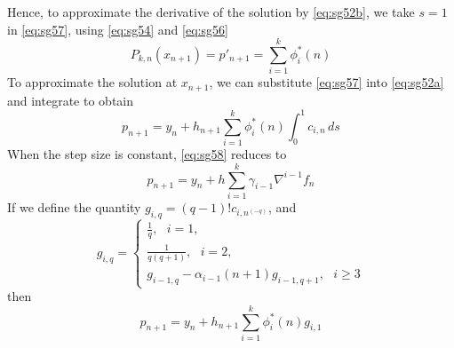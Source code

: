 Hence, to approximate the derivative of the solution by \autoref{eq:sg52b}, we 
take $s=1$ in \autoref{eq:sg57}, using \autoref{eq:sg54} and \autoref{eq:sg56}
\begin{equation}
  P_{k,n} (x_{n+1}) = p'_{n+1} = \sum^{k}_{i=1} \phi^{*}_{i} (n)
\end{equation}
To approximate the solution at $x_{n+1}$, we can substitute \autoref{eq:sg57} 
into \autoref{eq:sg52a} and integrate to obtain
\begin{equation}\label{eq:sg58}
  p_{n+1} = y_n + h_{n+1} \sum_{i=1}^{k} \phi ^{*}_{i} (n) \int_{0}^{1} c_{i,n} \,ds
\end{equation}
When the step size is constant, \autoref{eq:sg58} reduces to
\begin{equation}
  p_{n+1} = y_n +h \sum_{i=1}^{k} \gamma _{i-1} \nabla ^{i-1} f_n
\end{equation}
If we define the quantity $g_{i,q}=(q-1)!c_{i,n^{(-q)}}$, and 
\begin{equation}\label{eq:sg510}
  g_{i,q} = \begin{cases}
    \frac{1}{q}, \text{ } i=1,\\
    \frac{1}{q(q+1)}, \text{ } i=2,\\
    g_{i-1,q} - \alpha_{i-1}(n+1)g_{i-1,q+1}, \text{ } i \ge 3
  \end{cases}
\end{equation}
then
\begin{equation}\label{eq:sg511}
  p_{n+1} = y_n + h_{n+1} 
    \sum_{i=1}^{k} \phi ^{*}_{i} (n) g_{i,1}
\end{equation}


